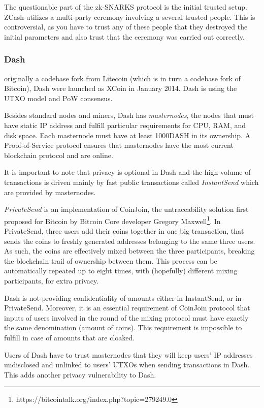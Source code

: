 \documentclass[a4paper, 10pt, conference]{ieeeconf}
\begin{document}
The questionable part of the zk-SNARKS protocol is the initial trusted setup. ZCash utilizes a multi-party ceremony involving a several trusted people. This is controversial, as you have to trust any of these people that they destroyed the initial parameters and also trust that the ceremony was carried out correctly. 

\subsubsection{Dash} originally a codebase fork from Litecoin (which is in turn a codebase fork of Bitcoin), Dash were launched as XCoin in January 2014. Dash is using the UTXO model and PoW consensus. 

Besides standard nodes and miners, Dash has \textit{masternodes}, the nodes that must have static IP address and fulfill particular requirements for CPU, RAM, and disk space. Each masternode must have at least 1000DASH in its ownership. A Proof-of-Service protocol ensures that masternodes have the most current blockchain protocol and are online. 

It is important to note that privacy is optional in Dash and the high volume of transactions is driven mainly by fast public transactions called \textit{InstantSend} which are provided by masternodes.

\textit{PrivateSend} is an implementation of CoinJoin, the untraceability solution first proposed for Bitcoin by Bitcoin Core developer Gregory Maxwell\footnote{https://bitcointalk.org/index.php?topic=279249.0}. In PrivateSend, three users add their coins together in one big transaction, that sends the coins to freshly generated addresses belonging to the same three users. As such, the coins are effectively mixed between the three participants, breaking the blockchain trail of ownership between them. This process can be automatically repeated up to eight times, with (hopefully) different mixing participants, for extra privacy.

Dash is not providing confidentiality of amounts either in InstantSend, or in PrivateSend. Moreover, it is an essential requirement of CoinJoin protocol that inputs of users involved in the round of the mixing protocol must have exactly the same denomination (amount of coins). This requirement is impossible to fulfill in case of amounts that are cloaked. 

Users of Dash have to trust masternodes that they will keep users' IP addresses undisclosed and unlinked to users' UTXOs when sending transactions in Dash. This adds another privacy vulnerability to Dash.
\end{document}
